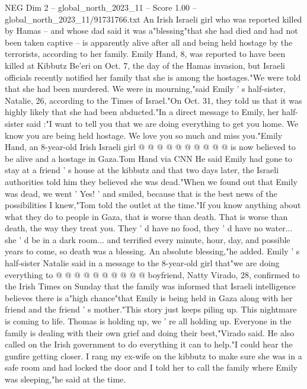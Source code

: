 \begin{textsample}{NEG Dim 2 – global\_north\_2023\_11 – Score 1.00 – global\_north\_2023\_11/91731766.txt}  \label{ex:f2_neg_143}
An Irish Israeli girl who was reported killed by Hamas -- and whose dad said it was a"blessing"that she had died and had not been taken captive -- is apparently alive after all and being held hostage by the terrorists, according to her family.
Emily Hand, 8, was reported to have been killed at Kibbutz Be'eri on Oct. 7, the day of the Hamas invasion, but Israeli officials recently notified her family that she is among the hostages."We were told that she had been murdered.
We were in mourning,"said Emily ' s half-sister, Natalie, 26, according to the Times of Israel."On Oct. 31, they told us that it was highly likely that she had been abducted."In a direct message to Emily, her half-sister said :"I want to tell you that we are doing everything to get you home.
We know you are being held hostage.
We love you so much and miss you."Emily Hand, an 8-year-old Irish Israeli girl @ @ @ @ @ @ @ @ @ @ is now believed to be alive and a hostage in Gaza.Tom Hand via CNN He said Emily had gone to stay at a friend ' s house at the kibbutz and that two days later, the Israeli authorities told him they believed she was dead."When we found out that Emily was dead, we went ' Yes! ' and smiled, because that is the best news of the possibilities I knew,"Tom told the outlet at the time."If you know anything about what they do to people in Gaza, that is worse than death.
That is worse than death, the way they treat you.
They ' d have no food, they ' d have no water... she ' d be in a dark room... and terrified every minute, hour, day, and possible years to come, so death was a blessing.
An absolute blessing,"he added.
Emily ' s half-sister Natalie said in a message to the 8-year-old girl that"we are doing everything to @ @ @ @ @ @ @ @ @ @ boyfriend, Natty Virado, 28, confirmed to the Irish Times on Sunday that the family was informed that Israeli intelligence believes there is a"high chance"that Emily is being held in Gaza along with her friend and the friend ' s mother."This story just keeps piling up.
This nightmare is coming to life.
Thomas is holding up, we ' re all holding up.
Everyone in the family is dealing with their own grief and doing their best,"Virado said.
He also called on the Irish government to do everything it can to help."I could hear the gunfire getting closer.
I rang my ex-wife on the kibbutz to make sure she was in a safe room and had locked the door and I told her to call the family where Emily was sleeping,"he said at the time.

\end{textsample}

